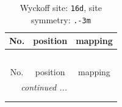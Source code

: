 \documentclass[fleqn,8pt]{jsarticle}
\begin{document}
\renewcommand{\arraystretch}{1.2}
\begin{longtable}{ccc}
\caption{Wyckoff site: {\tt 16d}, site symmetry: {\tt .-3m}}
 \\
 \hline \hline
No. & position & mapping \\ \hline \endfirsthead

\multicolumn{2}{l}{\tablename\ \thetable{}} \\
 \hline \hline
No. & position & mapping \\ \hline \endhead

 \hline \hline
\multicolumn{2}{r}{\footnotesize\it continued ...} \\ \endfoot

 \hline \hline
\multicolumn{2}{r}{} \\ \endlastfoot


\end{longtable}
\end{document}
